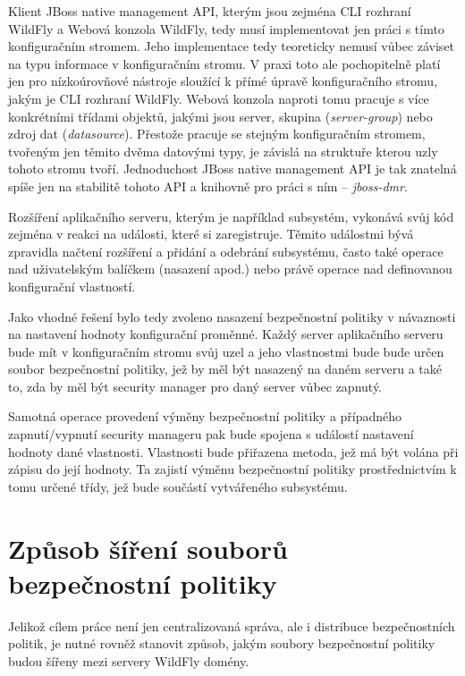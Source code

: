 Klient JBoss native management API, kterým jsou zejména CLI rozhraní WildFly a Webová konzola WildFly, tedy musí implementovat jen práci s tímto konfiguračním stromem. Jeho implementace tedy teoreticky nemusí vůbec záviset na typu informace v konfiguračním stromu. V praxi toto ale pochopitelně platí jen pro nízkoúrovňové nástroje sloužící k přímé úpravě konfiguračního stromu, jakým je CLI rozhraní WildFly. Webová konzola naproti tomu pracuje s více konkrétními třídami objektů, jakými jsou server, skupina ({\it server-group}) nebo zdroj dat ({\it datasource}). Přestože pracuje se stejným konfiguračním stromem, tvořeným jen těmito dvěma datovými typy, je závislá na struktuře kterou uzly tohoto stromu tvoří. Jednoduchost JBoss native management API je tak znatelná spíše jen na stabilitě tohoto API a knihovně pro práci s ním -- {\it jboss-dmr}. \cite{jbossDetypedManagement}

Rozšíření aplikačního serveru, kterým je například subsystém, vykonává svůj kód zejména v reakci na události, které si zaregistruje. Těmito událostmi bývá zpravidla načtení rozšíření a přidání a odebrání subsystému, často také operace nad uživatelským balíčkem (nasazení apod.) nebo právě operace nad definovanou konfigurační vlastností. \cite{WildFlyExtending}

Jako vhodné řešení bylo tedy zvoleno nasazení bezpečnostní politiky v návaznosti na nastavení hodnoty konfigurační proměnné. Každý server aplikačního serveru bude mít v konfiguračním stromu svůj uzel a jeho vlastnostmi bude bude určen soubor bezpečnostní politiky, jež by měl být nasazený na daném serveru a také to, zda by měl být security manager pro daný server vůbec zapnutý.

Samotná operace provedení výměny bezpečnostní politiky a případného zapnutí/vypnutí security manageru pak bude spojena s událostí nastavení hodnoty dané vlastnosti. Vlastnosti bude přiřazena metoda, jež má být volána při zápisu do její hodnoty. Ta zajistí výměnu bezpečnostní politiky prostřednictvím k tomu určené třídy, jež bude součástí vytvářeného subsystému.

\section{Způsob šíření souborů bezpečnostní politiky} \label{sireniSouboru}

Jelikož cílem práce není jen centralizovaná správa, ale i distribuce bezpečnostních politik, je nutné rovněž stanovit způsob, jakým soubory bezpečnostní politiky budou šířeny mezi servery WildFly domény.

